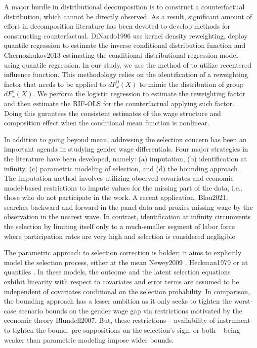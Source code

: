A major hurdle in distributional decomposition is to construct a counterfactual distribution, which cannot be directly observed. As a result, significant amount of effort in decomposition literature has been devoted to develop methods for constructing counterfactual. DiNardo1996 use kernel density reweighting, \parencite{Machado2005} deploy quantile regression to estimate the inverse conditional distribution function and Chernozhukov2013 estimating the conditional distributional regression model using quantile regression. In our study, we use the method of \textcite{Firpo2009} to utilize recentered influence function. This methodology relies on the identification of a reweighting factor that needs to be applied to $dF^0_x(X)$ to mimic the distribution of group  $dF^1_x(X)$. We perform the logistic regression to estimate the reweighting factor and then estimate the RIF-OLS for the counterfactual applying such factor. Doing this gurantees the consistent estimates of the wage structure and composition effect when the conditional mean function is nonlinear. \par

In addition to going beyond mean, addressing the selection concern has been an important agenda in studying gender wage differentials. Four major strategies in the literature have been developed, namely: (a) imputation, (b) identification at infinity, (c) parametric modeling of selection, and (d) the bounding approach \parencite{Machado2017}. The imputation method involves utilizing observed covariates and economic model-based restrictions to impute values for the missing part of the data, i.e., those who do not participate in the work. A recent application, Blau2021, searches backward and forward in the panel data and proxies missing wage by the observation in the nearest wave. In contrast, identification at infinity circumvents the selection by limiting itself only to a much-smaller segment of labor force where participation rates are very high and selection is considered negligible \parencite{Machado2017} \par

The parametric approach to selection correction is bolder; it aims to explicitly model the selection process, either at the mean Newey2009 , Heckman1979 or at quantiles \parencite{Buchinsky1998}. In these models, the outcome and the latent selection equations exhibit linearity with respect to covariates and error terms are assumed to be independent of covariates conditional on the selection probability. In comparison, the bounding approach has a lesser ambition as it only seeks to tighten the worst-case scenario bounds on the gender wage gap via restrictions motivated by the economic theory Blundell2007. But, these restrictions -- availability of instrument to tighten the bound, pre-suppositions on the selection's sign, or both -- being weaker than parametric modeling impose wider bounds.\par

